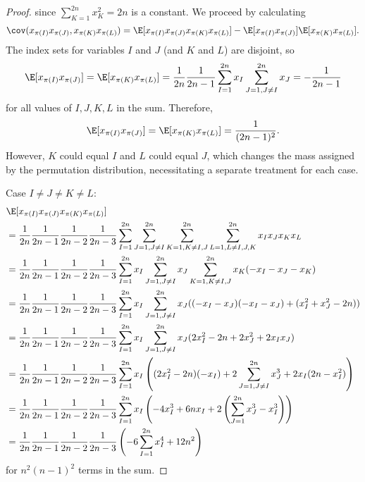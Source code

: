 \begin{proof}
  since $\sum_{K=1}^{2n}x_K^2 = 2n$ is a constant.  We proceed by calculating
  \begin{equation*}
    \cov(x_{\pi(I)}x_{\pi(J)},x_{\pi(K)}x_{\pi(L)})
    = \E[x_{\pi(I)}x_{\pi(J)}x_{\pi(K)}x_{\pi(L)}] - \E[x_{\pi(I)}x_{\pi(J)}]\E[x_{\pi(K)}x_{\pi(L)}].
  \end{equation*}
  The index sets for variables $I$ and $J$ (and $K$ and $L$) are disjoint, so
  \begin{equation*}
    \E[x_{\pi(I)}x_{\pi(J)}] = \E[x_{\pi(K)}x_{\pi(L)}]
    = \frac{1}{2n}\frac{1}{2n-1}\sum_{I=1}^{2n} x_{I} \sum_{J=1,J\neq I}^{2n} x_{J} = -\frac{1}{2n-1}
  \end{equation*}
  for all values of $I, J, K, L$ in the sum.  Therefore,
  \begin{equation*}
    \E[x_{\pi(I)}x_{\pi(J)}] = \E[x_{\pi(K)}x_{\pi(L)}] = \frac{1}{(2n-1)^2}.
  \end{equation*}
  However, $K$ could equal $I$ and $L$ could equal $J$, which changes the mass assigned by the
  permutation distribution, necessitating a separate treatment for each case.

  Case $I \neq J \neq K \neq L$:
  \begin{align*}
    &\E[x_{\pi(I)} x_{\pi(J)} x_{\pi(K)} x_{\pi(L)}] \\
    &= \frac{1}{2n}\frac{1}{2n-1}\frac{1}{2n-2}\frac{1}{2n-3}
    \sum_{I=1}^{2n} \sum_{J=1, J\neq I}^{2n} \sum_{K=1, K \neq I,J}^{2n} \sum_{L=1, L \neq I,J,K}^{2n}
    x_{I} x_{J} x_{K} x_{L} \\
    &= \frac{1}{2n}\frac{1}{2n-1}\frac{1}{2n-2}\frac{1}{2n-3}
    \sum_{I=1}^{2n} x_{I} \sum_{J=1, J\neq I}^{2n} x_{J} \sum_{K=1, K \neq
      I,J}^{2n} x_{K} (-x_{I}-x_{J}-x_{K}) \\
    &= \frac{1}{2n}\frac{1}{2n-1}\frac{1}{2n-2}\frac{1}{2n-3}
    \sum_{I=1}^{2n} x_{I} \sum_{J=1, J\neq I}^{2n} x_{J}
    ((-x_{I}-x_{J})(-x_{I}-x_{J})+(x_{I}^2+x_{J}^2-2n)) \\
    &= \frac{1}{2n}\frac{1}{2n-1}\frac{1}{2n-2}\frac{1}{2n-3}
    \sum_{I=1}^{2n} x_{I} \sum_{J=1, J\neq I}^{2n} x_{J}
    (2x_{I}^2-2n+2x_{J}^2+2x_{I}x_{J}) \\
    &= \frac{1}{2n}\frac{1}{2n-1}\frac{1}{2n-2}\frac{1}{2n-3}
    \sum_{I=1}^{2n} x_{I} \left (
      (2x_{I}^2-2n)(-x_{I})+2\sum_{J=1, J\neq I}^{2n} x_{J}^3+2x_{I}(2n-x_{I}^2)
    \right) \\
    &= \frac{1}{2n}\frac{1}{2n-1}\frac{1}{2n-2}\frac{1}{2n-3}
    \sum_{I=1}^{2n} x_{I} \left (
      -4x_{I}^3 + 6nx_{I} + 2\left (\sum_{J=1}^{2n}x_{J}^3 - x_{I}^3 \right )
    \right) \\
    &= \frac{1}{2n}\frac{1}{2n-1}\frac{1}{2n-2}\frac{1}{2n-3}
    \left ( -6\sum_{I=1}^{2n}x_{I}^4+12n^2 \right )
  \end{align*}
  for $n^2(n-1)^2$ terms in the sum.


\end{proof}
